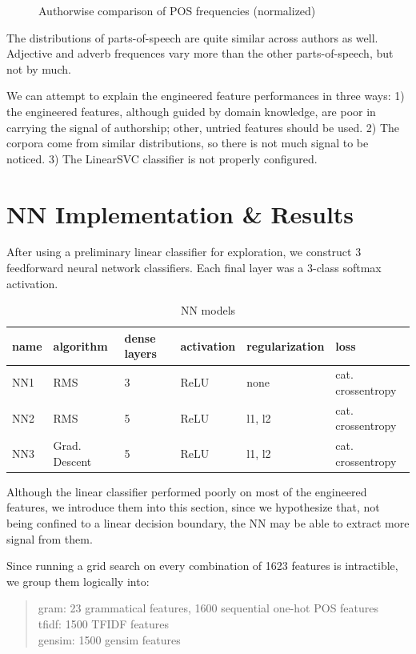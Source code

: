 \documentclass[12pt]{article}
\begin{document}
\begin{figure}[h]
\begin{multicols}{3}
  \end{multicols} 

  \caption{Authorwise comparison of POS frequencies (normalized)}
  \label{fig:punc}

\end{figure}

The distributions of parts-of-speech are quite similar across authors as well. Adjective and adverb frequences vary more than the other parts-of-speech, but not by much.

We can attempt to explain the engineered feature performances in three ways: 1) the engineered features, although guided by domain knowledge, are poor in carrying the signal of authorship; other, untried features should be used. 2) The corpora come from similar distributions, so there is not much signal to be noticed. 3) The LinearSVC classifier is not properly configured.


\section{NN Implementation \& Results}
After using a preliminary linear classifier for exploration, we construct 3 feedforward neural network classifiers. Each final layer was a 3-class softmax activation.
  \vskip 0.2in
  \begin{table}[h]
    \centering
    \begin{tabular}{|l|l|l|l|l|l|}
      \hline
      name & algorithm & dense layers & activation & regularization & loss \\
      \hline
      NN1 & RMS & 3 & ReLU & none & cat. crossentropy    \\
      NN2 & RMS & 5 & ReLU & l1, l2 & cat. crossentropy    \\
      NN3 & Grad. Descent & 5 & ReLU & l1, l2 & cat. crossentropy    \\
      \hline
    \end{tabular}
    \caption{NN models}
    \label{tab:nn_desc}
  \end{table}

Although the linear classifier performed poorly on most of the engineered features, we introduce them into this section, since we hypothesize that, not being confined to a linear decision boundary, the NN may be able to extract more signal from them. 

Since running a grid search on every combination of 1623 features is intractible, we group them logically into:

\begin{quote}
  gram: 23 grammatical features, 1600 sequential one-hot POS features\\
  tfidf: 1500 TFIDF features\\
  gensim: 1500 gensim features\\
\end{quote}
\end{document}
